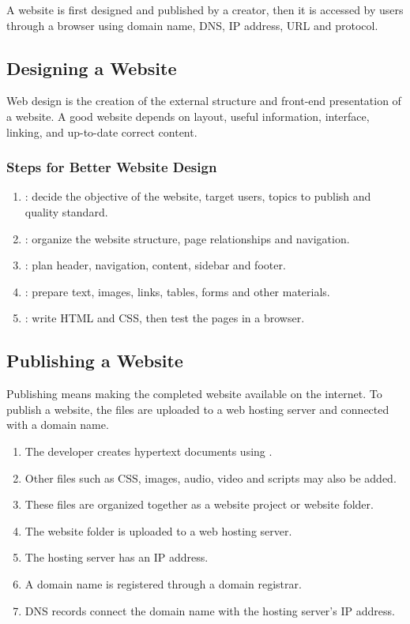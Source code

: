 A website is first designed and published by a creator, then it is accessed by users through a browser using domain name, DNS, IP address, URL and protocol.

\subsection{Designing a Website}
Web design is the creation of the external structure and front-end presentation of a website. A good website depends on layout, useful information, interface, linking, and up-to-date correct content.

\subsubsection{Steps for Better Website Design}
\begin{enumerate}
    \item {}: decide the objective of the website, target users, topics to publish and quality standard.
    \item {}: organize the website structure, page relationships and navigation.
    \item {}: plan header, navigation, content, sidebar and footer.
    \item {}: prepare text, images, links, tables, forms and other materials.
    \item {}: write HTML and CSS, then test the pages in a browser.
\end{enumerate}

\subsection{Publishing a Website}
Publishing means making the completed website available on the internet. To publish a website, the files are uploaded to a web hosting server and connected with a domain name.

\begin{enumerate}
    \item The developer creates hypertext documents using .
    \item Other files such as CSS, images, audio, video and scripts may also be added.
    \item These files are organized together as a website project or website folder.
    \item The website folder is uploaded to a web hosting server.
    \item The hosting server has an IP address.
    \item A domain name is registered through a domain registrar.
    \item DNS records connect the domain name with the hosting server's IP address.
\end{enumerate}

